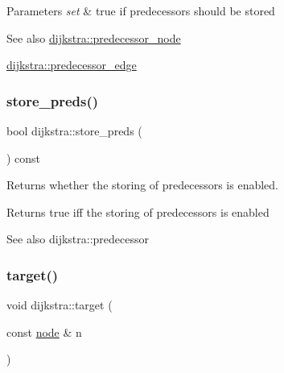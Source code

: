 \begin{DoxyParams}{Parameters}
{\em set} & {\ttfamily true} if predecessors should be stored\\
\hline
\end{DoxyParams}
\begin{DoxySeeAlso}{See also}
\mbox{\hyperlink{classdijkstra_a99c17ee7c2b55574ea8c2952fac09faf}{dijkstra\+::predecessor\+\_\+node}} 

\mbox{\hyperlink{classdijkstra_aa3ef1a7d7dfc33e4a39aff309f873929}{dijkstra\+::predecessor\+\_\+edge}} 
\end{DoxySeeAlso}
\mbox{\label{classdijkstra_a8ef3ee087994a56b774f48fd331725a3}} 
\subsubsection{\texorpdfstring{store\+\_\+preds()}{store\_preds()}\hspace{0.1cm}{\footnotesize\ttfamily [2/2]}}
{\footnotesize\ttfamily bool dijkstra\+::store\+\_\+preds (\begin{DoxyParamCaption}{ }\end{DoxyParamCaption}) const}



Returns whether the storing of predecessors is enabled. 

\begin{DoxyReturn}{Returns}
{\ttfamily true} iff the storing of predecessors is enabled
\end{DoxyReturn}
\begin{DoxySeeAlso}{See also}
dijkstra\+::predecessor 
\end{DoxySeeAlso}
\mbox{\label{classdijkstra_a1e9971d767046306574551a461aa2238}} 
\subsubsection{\texorpdfstring{target()}{target()}\hspace{0.1cm}{\footnotesize\ttfamily [1/2]}}
{\footnotesize\ttfamily void dijkstra\+::target (\begin{DoxyParamCaption}\item[{const \mbox{\hyperlink{classnode}{node}} \&}]{n }\end{DoxyParamCaption})}




